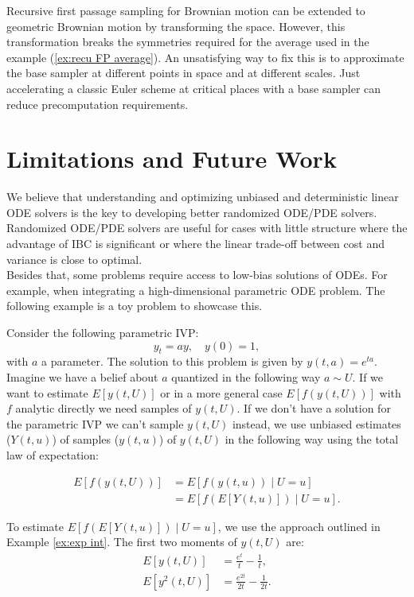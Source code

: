 \documentclass[a4paper,12pt]{article}
\begin{document}
Recursive first passage sampling for Brownian motion can be extended to geometric
Brownian motion by transforming the space. However, this transformation breaks
the symmetries required for the average used in the example (\ref{ex:recu FP average}).
An unsatisfying way to fix this is to approximate the base sampler at different points in
space and at different scales. Just accelerating a classic Euler scheme at critical places
with a base sampler can reduce precomputation requirements.


\section{Limitations and Future Work}

We believe that understanding and optimizing unbiased and deterministic linear ODE solvers
is the key to developing better randomized ODE/PDE solvers.
Randomized ODE/PDE solvers are useful for cases with little structure
where the advantage of IBC is significant or where the linear trade-off
between cost and variance is close to optimal. \\


Besides that, some problems require access to low-bias solutions of
ODEs. For example, when integrating a high-dimensional parametric ODE problem.
The following example is a toy problem to showcase this.

\begin{example} \label{ex:random ode}
    Consider the following parametric IVP:
    \begin{equation}\label{eq:random ode}
        y_t = ay, \quad y(0)=1,
    \end{equation}
    with $a$ a parameter. The solution to this problem is given by
    $y(t,a) = e^{ta}$. Imagine we have a belief about $a$ quantized
    in the following way $a\sim U$. If we want
    to estimate $E[y(t, U)]$ or in a more general case
    $E[f(y(t, U))]$ with $f$ analytic directly
    we need samples of $y(t,U)$. If we don't have a solution for the parametric IVP
    we can't sample $y(t,U)$ instead, we use unbiased estimates ($Y(t,u)$) of samples ($y(t,u)$)
    of $y(t, U)$ in the following
    way using the total law of expectation:

    \begin{align}
        E[f(y(t,U))] & = E[f(y(t,u)) \mid U=u]     \\
                     & = E[f(E[Y(t,u)]) \mid U=u].
    \end{align}

    To estimate $E[f(E[Y(t,u)]) \mid U =u]$, we use the approach outlined in
    Example \ref{ex:exp int}. The first two moments of $y(t, U)$ are:
    \begin{align}
        E[y(t,U)]      & = \frac{e^t}{t} - \frac{1}{t},      \\
        E[y^{2}(t, U)] & = \frac{e^{2t}}{2t} - \frac{1}{2t}.
    \end{align}
\end{example}
\end{document}
